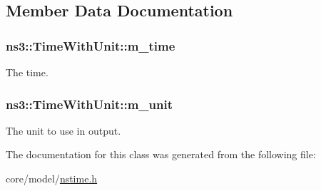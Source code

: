 \subsection{Member Data Documentation}
\subsubsection[{\texorpdfstring{m\+\_\+time}{m_time}}]{ ns3\+::\+Time\+With\+Unit\+::m\+\_\+time\hspace{0.3cm}{\ttfamily [private]}}\hypertarget{classns3_1_1TimeWithUnit_ae9d213eec512d83f5ad6677fa4c028dd}{}\label{classns3_1_1TimeWithUnit_ae9d213eec512d83f5ad6677fa4c028dd}


The time. 

\subsubsection[{\texorpdfstring{m\+\_\+unit}{m_unit}}]{ ns3\+::\+Time\+With\+Unit\+::m\+\_\+unit\hspace{0.3cm}{\ttfamily [private]}}\hypertarget{classns3_1_1TimeWithUnit_afa2cf9b8cbc6c6b3e951981d6fa3643b}{}\label{classns3_1_1TimeWithUnit_afa2cf9b8cbc6c6b3e951981d6fa3643b}


The unit to use in output. 



The documentation for this class was generated from the following file\+:\begin{DoxyCompactItemize}
\item 
core/model/\hyperlink{nstime_8h}{nstime.\+h}\end{DoxyCompactItemize}
